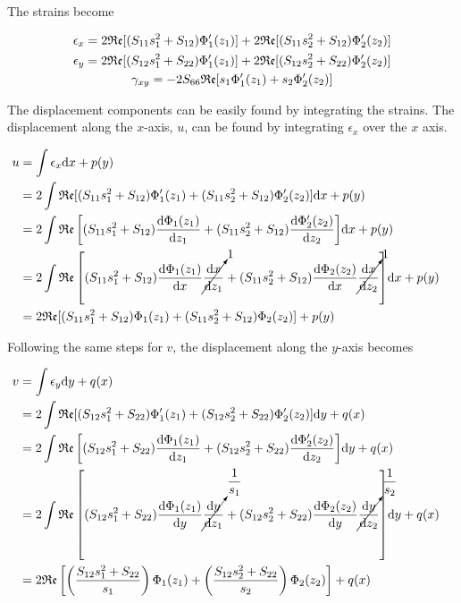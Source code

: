 \documentclass{article}
\begin{document}
The strains become

\begin{gather}
    \epsilon_x = 2 \mathfrak{Re}[(S_{11} s_1^2 + S_{12}) \Phi'_1(z_1)] + 2 \mathfrak{Re}[(S_{11} s_2^2 + S_{12}) \Phi'_2(z_2)]  \notag \\
    \epsilon_y = 2 \mathfrak{Re}[(S_{12} s_1^2 + S_{22}) \Phi'_1(z_1)] + 2 \mathfrak{Re}[(S_{12} s_2^2 + S_{22}) \Phi'_2(z_2)]  \notag \\
    \gamma_{xy} = -2 S_{66} \mathfrak{Re}[s_1 \Phi'_1(z_1) + s_2 \Phi'_2(z_2)]
    \label{eq:strains}
\end{gather}

The displacement components can be easily found by integrating the strains. The displacement along the $x$-axis, $u$, can be found by integrating $\epsilon_x$ over the $x$ axis.

\begin{align*}
    u & = \int{\epsilon_x} \mathrm{d} x + p(y) & \\
      & = 2 \int{\mathfrak{Re}[(S_{11} s_1^2 + S_{12}) \Phi'_1(z_1) + (S_{11} s_2^2 + S_{12}) \Phi'_2(z_2)]} \mathrm{d} x + p(y) & \\
      & = 2 \int{\mathfrak{Re} \left [ (S_{11} s_1^2 + S_{12}) \dfrac{\mathrm{d}\Phi_1(z_1)}{\mathrm{d} z_1} + (S_{11} s_2^2 + S_{12}) \dfrac{\mathrm{d}\Phi'_2(z_2)}{\mathrm{d} z_2} \right]} \mathrm{d} x + p(y) & \\
      & = 2 \int{\mathfrak{Re} \left [ (S_{11} s_1^2 + S_{12}) \dfrac{\mathrm{d}\Phi_1(z_1)}{\mathrm{d} x}\cancelto{1}{\dfrac{\mathrm{d} x}{\mathrm{d} z_1}} + (S_{11} s_2^2 + S_{12}) \dfrac{\mathrm{d}\Phi_2(z_2)}{\mathrm{d} x}\cancelto{1}{\dfrac{\mathrm{d} x}{\mathrm{d} z_2}} \right]} \mathrm{d} x + p(y) & \\
      & = 2 \mathfrak{Re}[(S_{11} s_1^2 + S_{12}) \Phi_1(z_1) + (S_{11} s_2^2 + S_{12}) \Phi_2(z_2)] + p(y)
\end{align*}

Following the same steps for $v$, the displacement along the $y$-axis becomes

\begin{align*}
    v & = \int{\epsilon_y} \mathrm{d} y + q(x) & \\
      & = 2 \int{\mathfrak{Re}[(S_{12} s_1^2 + S_{22}) \Phi'_1(z_1) + (S_{12} s_2^2 + S_{22}) \Phi'_2(z_2)]} \mathrm{d} y + q(x) & \\
      & = 2 \int{\mathfrak{Re} \left [ (S_{12} s_1^2 + S_{22}) \dfrac{\mathrm{d}\Phi_1(z_1)}{\mathrm{d} z_1} + (S_{12} s_2^2 + S_{22}) \dfrac{\mathrm{d}\Phi'_2(z_2)}{\mathrm{d} z_2} \right]} \mathrm{d} y + q(x) & \\
      & = 2 \int{\mathfrak{Re} \left [ (S_{12} s_1^2 + S_{22}) \dfrac{\mathrm{d}\Phi_1(z_1)}{\mathrm{d} y}\cancelto{\dfrac{1}{s_1}}{\dfrac{\mathrm{d} y}{\mathrm{d} z_1}} + (S_{12} s_2^2 + S_{22}) \dfrac{\mathrm{d}\Phi_2(z_2)}{\mathrm{d} y}\cancelto{\dfrac{1}{s_2}}{\dfrac{\mathrm{d} y}{\mathrm{d} z_2}} \right]} \mathrm{d} y + q(x) & \\
      & = 2 \mathfrak{Re}\left[\left(\dfrac{S_{12} s_1^2 + S_{22}}{s_1}\right) \Phi_1(z_1) + \left(\dfrac{S_{12} s_2^2 + S_{22}}{s_2}\right) \Phi_2(z_2)\right] + q(x)
\end{align*}
\end{document}
